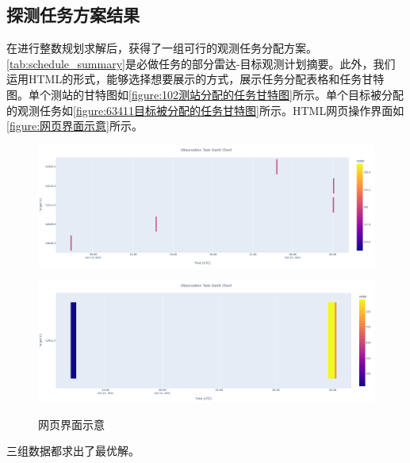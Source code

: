 \documentclass[openany,zihao=-4,UTF8]{ctexart}
\begin{document}
\subsection{探测任务方案结果}
在进行整数规划求解后，获得了一组可行的观测任务分配方案。\autoref{tab:schedule_summary}是必做任务的部分雷达-目标观测计划摘要。此外，我们运用HTML的形式，能够选择想要展示的方式，展示任务分配表格和任务甘特图。单个测站的甘特图如\autoref{figure:102测站分配的任务甘特图}所示。单个目标被分配的观测任务如\autoref{figure:63411目标被分配的任务甘特图}所示。HTML网页操作界面如\autoref{figure:网页界面示意}所示。
\begin{figure}[htbp]\centering
	\begin{minipage}[b]{0.49\columnwidth}\centering
		\includegraphics[width=\linewidth]{figures/102测站.png}\label{figure:102测站分配的任务甘特图}
	\end{minipage}
	\begin{minipage}[b]{0.49\columnwidth}\centering
		\includegraphics[width=\linewidth]{figures/63411目标.png}\label{figure:63411目标被分配的任务甘特图}
	\end{minipage}
	\caption{网页界面示意}\label{figure:网页界面示意}
\end{figure}

三组数据都求出了最优解。
\end{document}
